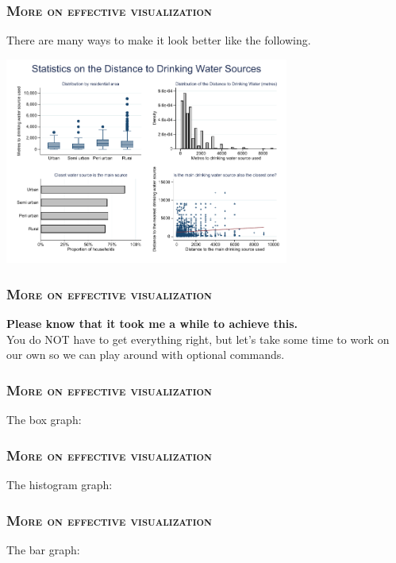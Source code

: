 \documentclass[10pt]{beamer}
\begin{document}
	\begin{frame}
	\frametitle{\textsc{More on effective visualization}}
		There are many ways to make it look better like the following. \\
		\vspace{1mm}
	
\begin{center}
    \includegraphics[width=0.7\textwidth]{combined_better.pdf}
\end{center}
	\end{frame}

	\begin{frame}
	\frametitle{\textsc{More on effective visualization}}
		\textbf{Please know that it took me a while to achieve this.} \\
		\vspace{1mm}
		You do NOT have to get everything right, but let's take some time to work 
		on our own so we can play around with optional commands. 
	\end{frame}	

	\begin{frame}
	\frametitle{\textsc{More on effective visualization}}
	The box graph:
\begin{stlog}\end{stlog}
	\end{frame}	

	\begin{frame}
	\frametitle{\textsc{More on effective visualization}}
	The histogram graph:
\begin{stlog}\end{stlog}
	\end{frame}	

	\begin{frame}
	\frametitle{\textsc{More on effective visualization}}
	The bar graph:
\begin{stlog}\end{stlog}
	\end{frame}	
\end{document}
